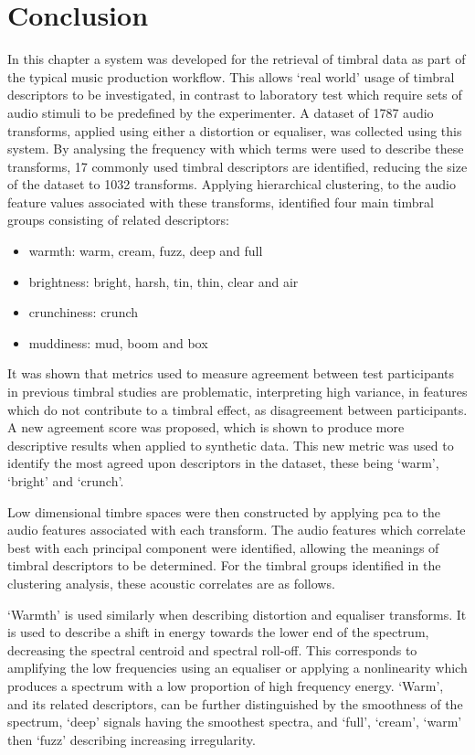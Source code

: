\section{Conclusion}
	In this chapter a system was developed for the retrieval of timbral data as part of the typical music production
	workflow. This allows `real world' usage of timbral descriptors to be investigated, in contrast to laboratory test
	which require sets of audio stimuli to be predefined by the experimenter. A dataset of 1787 audio transforms,
	applied using either a distortion or equaliser, was collected using this system. By analysing the frequency with
	which terms were used to describe these transforms, 17 commonly used timbral descriptors are identified, reducing
	the size of the dataset to 1032 transforms.  Applying hierarchical clustering, to the audio feature values
	associated with these transforms, identified four main timbral groups consisting of related descriptors:

	\begin{itemize}
		\item warmth: warm, cream, fuzz, deep and full
		\item brightness: bright, harsh, tin, thin, clear and air
		\item crunchiness: crunch
		\item muddiness: mud, boom and box
	\end{itemize}

	It was shown that metrics used to measure agreement between test participants in previous timbral studies are
	problematic, interpreting high variance, in features which do not contribute to a timbral effect, as disagreement
	between participants. A new agreement score was proposed, which is shown to produce more descriptive results when
	applied to synthetic data. This new metric was used to identify the most agreed upon descriptors in the dataset,
	these being `warm', `bright' and `crunch'.

	Low dimensional timbre spaces were then constructed by applying \acrshort{pca} to the audio features associated
	with each transform. The audio features which correlate best with each principal component were identified,
	allowing the meanings of timbral descriptors to be determined. For the timbral groups identified in the clustering
	analysis, these acoustic correlates are as follows.

	`Warmth' is used similarly when describing distortion and equaliser transforms. It is used to describe a shift in
	energy towards the lower end of the spectrum, decreasing the spectral centroid and spectral roll-off. This
	corresponds to amplifying the low frequencies using an equaliser or applying a nonlinearity which produces a
	spectrum with a low proportion of high frequency energy. `Warm', and its related descriptors, can be further
	distinguished by the smoothness of the spectrum, `deep' signals having the smoothest spectra, and `full', `cream',
	`warm' then `fuzz' describing increasing irregularity.

